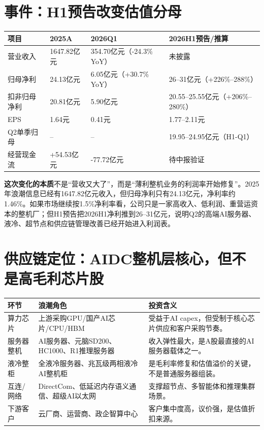 \documentclass[a4paper,11pt,fontset=none]{ctexart}
\begin{document}
\section{事件：H1预告改变估值分母}

\begin{exhibitbox}
\begin{tabularx}{\exhibitboxwidth}{L{2.5cm}L{2.6cm}L{2.7cm}X}
\toprule
\textbf{项目} & \textbf{2025A} & \textbf{2026Q1} & \textbf{2026H1预告/推算} \\
\midrule
营业收入 & 1647.82亿元 & 354.70亿元（-24.3\% YoY） & 未披露 \\
归母净利 & 24.13亿元 & 6.05亿元（+30.7\% YoY） & 26--31亿元（+226\%--288\%） \\
扣非归母净利 & 20.81亿元 & 5.90亿元 & 20.55--25.55亿元（+206\%--280\%） \\
EPS & 1.64元 & 0.41元 & 1.77--2.11元 \\
Q2单季归母 & -- & -- & 19.95--24.95亿元（H1-Q1） \\
经营现金流 & +54.53亿元 & -77.72亿元 & 待中报验证 \\
\bottomrule
\end{tabularx}
\end{exhibitbox}

\textbf{这次变化的本质}不是“营收又大了”，而是“薄利整机业务的利润率开始修复”。2025年浪潮信息已经有1647.82亿元收入，但归母净利只有24.13亿元，净利率约1.46\%。如果市场继续按1.5\%净利率看，公司只是一家高收入、低利润、重营运资本的整机厂；但H1预告把2026H1净利推到26--31亿元，说明Q2的高端AI服务器、液冷、超节点和供应链管理改善已经开始进入利润表。

\section{供应链定位：AIDC整机层核心，但不是高毛利芯片股}

\noindent\begin{tabularx}{\textwidth}{L{2.2cm}L{4.0cm}X}
\toprule
\textbf{环节} & \textbf{浪潮角色} & \textbf{投资含义} \\
\midrule
算力芯片 & 上游采购GPU/国产AI芯片/CPU/HBM & 受益于AI capex，但受制于核心芯片供应和客户采购节奏。 \\
服务器整机 & AI服务器、元脑SD200、HC1000、R1推理服务器 & 收入弹性最大，是A股最直接的AI服务器载体之一。 \\
液冷整柜 & 全液冷服务器、兆瓦级两相液冷AI整机柜 & 是毛利率修复和估值溢价的关键，不是普通服务器组装。 \\
互连/网络 & DirectCom、低延迟内存语义通信、超级AI以太网 & 支撑超节点、多智能体和推理集群场景。 \\
下游客户 & 云厂商、运营商、政企智算中心 & 客户集中度高，议价强，是估值折扣来源。 \\
\bottomrule
\end{tabularx}
\end{document}
